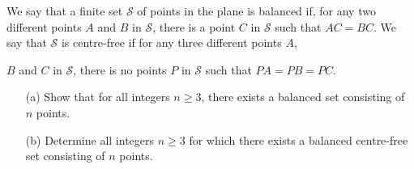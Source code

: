 We say that a finite set 
$\mathcal{S}$
of points in the plane is 
balanced
if, for any two different points 
$A$
and 
$B$
in 
$\mathcal{S}$, 
there is a point 
$C$
in 
$\mathcal{S}$
such that 
$AC=BC$.
We say that 
$\mathcal{S}$
is 
centre-free
if for any three different points 
$A$, 

$B$
and 
$C$
in 
$\mathcal{S}$, 
there is no points 
$P$
in 
$\mathcal{S}$
such that 
$PA=PB=PC$.

\begin{itemize}
	\item[(a)] Show that for all integers 
	$n\ge 3$, 
	there exists a balanced set consisting of 
	$n$
	points.


	\item[(b)] Determine all integers 
	$n\ge 3$
	for which there exists a balanced centre-free set consisting of 
	$n$
	points.

\end{itemize}

